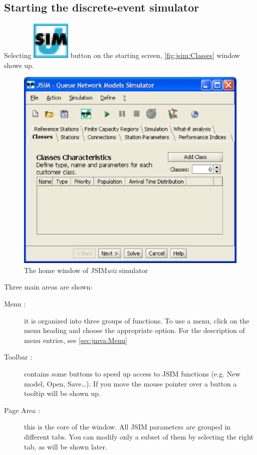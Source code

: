 \subsection{Starting the discrete-event simulator}
Selecting \includegraphics[scale=.5]{img/JSIMIcon.eps} button on the
starting screen, \autoref{fig:jsim:Classes} window shows up.
\begin{figure}[htb]
    \begin{center}
        \includegraphics[scale=.5]{img/jsim/define_class1.eps}
    \end{center}
    \caption{The home window of JSIM\emph{wiz} simulator}
    \label{fig:jsim:Classes}
\end{figure}
Three main areas are shown:
\begin{description}
\item[Menu :] it is organized into three groups of functions. To use a
menu, click on the menu heading and choose the appropriate option.
For the description of menu entries, see \autoref{sec:jmva:Menu}
\item[Toolbar :] contains some buttons to speed up access to JSIM functions
(e.g. New model, Open, Save\dots ). If you move the mouse pointer over a button a tooltip will be shown up.
\item[Page Area :] this is the core of the window. All JSIM parameters are grouped in
different tabs. You can modify only a subset of them by selecting
the right tab, as will be shown later.
\end{description}

